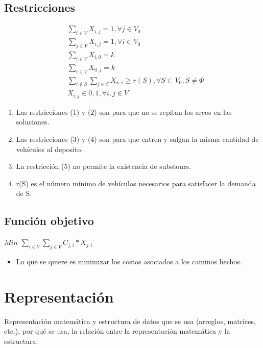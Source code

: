 \documentclass[letter, 10pt]{article}
\begin{document}
\subsection{Restricciones}

\begin{align}
 &\displaystyle\sum_{i \in V}X_{i,j} = 1, \forall j \in V_{0} \\
 &\displaystyle\sum_{j \in V}X_{i,j} = 1, \forall i \in V_{0} \\
 &\displaystyle\sum_{i \in V}X_{i,0} = k \\
 &\displaystyle\sum_{i \in V}X_{0,j} = k \\
 &\displaystyle\sum_{i \not\in S}\sum_{j \in S}X_{x,i} \geq r(S), \forall S \subset V_{0}, S \neq \Phi  \\
 &X_{i,j} \in {0,1}, \forall i,j \in V
\end{align}

\begin{enumerate}
 \item Las restricciones (1) y (2) son para que no se repitan los arcos en las soluciones.
 \item Las restricciones (3) y (4) son para que entren y salgan la misma cantidad de veh\'iculos al deposito.
 \item La restricci\'on (5) no permite la existencia de substours.
 \item r(S) es el n\'umero m\'inimo de veh\'iculos necesarios para satisfacer la demanda de S.
 
 
\end{enumerate}

\subsection{Funci\'on objetivo}

\begin{center}
$Min$ $\displaystyle\sum_{i \in V}\sum_{j \in V} C_{j,i}*X_{j,i}$
\end{center}
\begin{itemize}
 \item Lo que se quiere es minimizar los costos asociados a los caminos hechos.
\end{itemize}

\newpage
\section{Representaci\'on}
Representaci\'on matem\'atica y estructura de datos que se usa (arreglos, matrices, etc.),
por qu\'e se usa, la relaci\'on entre la representaci\'on matem\'atica y la estructura.
\end{document}
